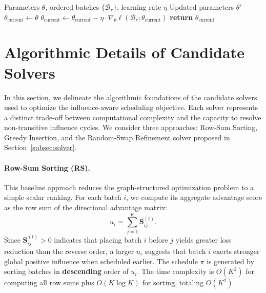 \begin{algorithm}
\caption{SGDUpdate (Phase 4)}
\begin{algorithmic}[1]
\REQUIRE Parameters $\theta$, ordered batches $\{\mathcal{B}_r\}$, learning rate $\eta$
\ENSURE Updated parameters $\theta'$
\STATE $\theta_{\text{current}} \gets \theta$
    \STATE $\theta_{\text{current}} \gets \theta_{\text{current}} - \eta \cdot \nabla_\theta \ell(\mathcal{B}_r; \theta_{\text{current}})$
\ENDFOR
\STATE \textbf{return} $\theta_{\text{current}}$
\end{algorithmic}
\end{algorithm}



\clearpage
\section{Algorithmic Details of Candidate Solvers}
\label{subsec:solver_details}

In this section, we delineate the algorithmic foundations of the candidate solvers used to optimize the influence-aware scheduling objective. Each solver represents a distinct trade-off between computational complexity and the capacity to resolve non-transitive influence cycles. We consider three approaches: Row-Sum Sorting, Greedy Insertion, and the Random-Swap Refinement solver proposed in Section~\ref{subsec:solver}.

\paragraph{Row-Sum Sorting (RS).}
This baseline approach reduces the graph-structured optimization problem to a simple scalar ranking. For each batch $i$, we compute its aggregate advantage score as the row sum of the directional advantage matrix:
\[
u_i = \sum_{j=1}^{K} \mathbf{S}^{(t)}_{ij}.
\]
Since $\mathbf{S}^{(t)}_{ij} > 0$ indicates that placing batch $i$ before $j$ yields greater loss reduction than the reverse order, a larger $u_i$ suggests that batch $i$ exerts stronger global positive influence when scheduled earlier. The schedule $\pi$ is generated by sorting batches in \textbf{descending} order of $u_i$. The time complexity is $O(K^2)$ for computing all row sums plus $O(K \log K)$ for sorting, totaling $O(K^2)$.

